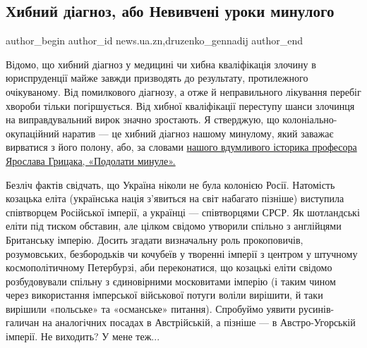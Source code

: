  
 
 
 
 
\subsection{Хибний діагноз, або Невивчені уроки минулого}
\label{sec:15_01_2022.stz.news.ua.zn.1.diagnoz}

\ifcmt
 author_begin
   author_id news.ua.zn,druzenko_gennadij
 author_end
\fi

Відомо, що хибний діагноз у медицині чи хибна кваліфікація злочину в
юриспруденції майже завжди призводять до результату, протилежного очікуваному.
Від помилкового діагнозу, а отже й неправильного лікування перебіг хвороби
тільки погіршується. Від хибної кваліфікації переступу шанси злочинця на
виправдувальний вирок значно зростають. Я стверджую, що колоніально-окупаційний
наратив — це хибний діагноз нашому минулому, який заважає вирватися з його
полону, або, за словами \href{https://nashformat.ua/products/podolaty-mynule-globalna-istoriya-ukrainy-925296}{%
нашого вдумливого історика професора Ярослава Грицака,
«Подолати минуле».}


Безліч фактів свідчать, що Україна ніколи не була колонією Росії. Натомість
козацька еліта (українська нація з’явиться на світ набагато пізніше) виступила
співтворцем Російської імперії, а українці — співтворцями СРСР. Як шотландські
еліти під тиском обставин, але цілком свідомо утворили спільно з англійцями
Британську імперію. Досить згадати визначальну роль прокоповичів, розумовських,
безбородьків чи кочубеїв у творенні імперії з центром у штучному
космополітичному Петербурзі, аби переконатися, що козацькі еліти свідомо
розбудовували спільну з єдиновірними московитами імперію (і таким чином через
використання імперської військової потуги воліли вирішити, й таки вирішили
«польське» та «османське» питання). Спробуймо уявити русинів-галичан на
аналогічних посадах в Австрійській, а пізніше — в Австро-Угорській імперії. Не
виходить? У мене теж...


